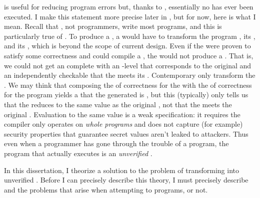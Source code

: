  is useful for reducing program errors but, thanks to
, essentially no  has ever been executed.
I make this statement more precise later in ,
but for now, here is what I mean.
Recall that , not programmers, write most programs, and this is
particularly true of .
To produce a , a  would have to transform
the program , its , and its
, which is beyond the scope of current  design.
Even if the  were proven to satisfy some 
correctness  and could compile a , the  would not produce a
.
That is, we could not get an   complete with an
-level  that corresponds to the original
 and an independently checkable  that the
 meets its .
Contemporary   only transform the
.
We may think that composing the  of correctness for the
 with the  of correctness for the program yields a
 that the generated  is , but this
(typically) only tells us that the  reduces to the same value
as the original , not that the  meets
the original .
Evaluation to the same value is a weak specification: it requires the compiler
only operates on \emph{whole programs} and does not capture (for example)
security properties that guarantee secret values aren't leaked to attackers.
Thus even when a programmer has gone through the trouble of  a
program, the program that actually executes is an \emph{unverified}
.

In this dissertation, I theorize a solution to the problem of 
transforming  into unverified .
Before I can precisely describe this theory, I must precisely describe
 and the problems that arise when attempting to
 programs,  or not.

